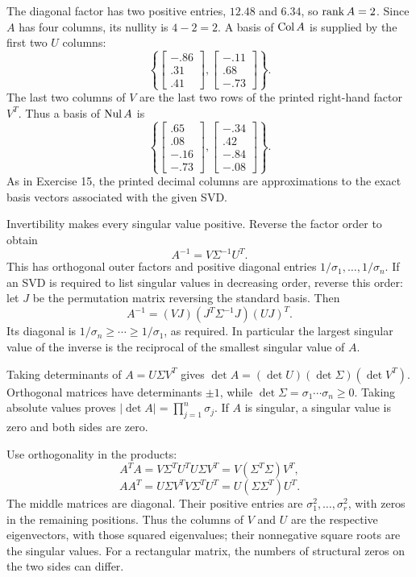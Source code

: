 The diagonal factor has two positive entries, $12.48$ and $6.34$, so $\operatorname{rank} A=2$. Since $A$ has four columns, its nullity is $4-2=2$.
A basis of $\operatorname{Col} A$ is supplied by the first two $U$ columns:
\[
\left\{\begin{bmatrix}-.86\\.31\\.41\end{bmatrix},
\begin{bmatrix}-.11\\.68\\-.73\end{bmatrix}\right\}.
\]
The last two columns of $V$ are the last two rows of the printed right-hand factor $V^T$. Thus a basis of $\operatorname{Nul} A$ is
\[
\left\{\begin{bmatrix}.65\\.08\\-.16\\-.73\end{bmatrix},
\begin{bmatrix}-.34\\.42\\-.84\\-.08\end{bmatrix}\right\}.
\]
As in Exercise 15, the printed decimal columns are approximations to the exact basis vectors associated with the given SVD.

Invertibility makes every singular value positive. Reverse the factor order to obtain
\[
A^{-1}=V\Sigma^{-1}U^T.
\]
This has orthogonal outer factors and positive diagonal entries $1/\sigma_1,\ldots,1/\sigma_n$. If an SVD is required to list singular values in decreasing order, reverse this order: let $J$ be the permutation matrix reversing the standard basis. Then
\[
A^{-1}=(VJ)(J^T\Sigma^{-1}J)(UJ)^T.
\]
Its diagonal is $1/\sigma_n\ge\cdots\ge1/\sigma_1$, as required. In particular the largest singular value of the inverse is the reciprocal of the smallest singular value of $A$.

Taking determinants of $A=U\Sigma V^T$ gives $\det A=(\det U)(\det\Sigma)(\det V^T)$. Orthogonal matrices have determinants $\pm1$, while $\det\Sigma=\sigma_1\cdots\sigma_n\ge0$. Taking absolute values proves $|\det A|=\prod_{j=1}^n\sigma_j$. If $A$ is singular, a singular value is zero and both sides are zero.

Use orthogonality in the products:
\[
A^TA=V\Sigma^TU^TU\Sigma V^T=V(\Sigma^T\Sigma)V^T,
\]
\[
AA^T=U\Sigma V^TV\Sigma^TU^T=U(\Sigma\Sigma^T)U^T.
\]
The middle matrices are diagonal. Their positive entries are $\sigma_1^2,\ldots,\sigma_r^2$, with zeros in the remaining positions. Thus the columns of $V$ and $U$ are the respective eigenvectors, with those squared eigenvalues; their nonnegative square roots are the singular values. For a rectangular matrix, the numbers of structural zeros on the two sides can differ.

